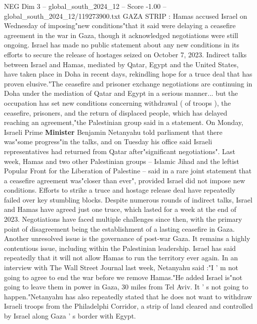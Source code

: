 \begin{textsample}{NEG Dim 3 – global\_south\_2024\_12 – Score -1.00 – global\_south\_2024\_12/119273900.txt}  \label{ex:f3_neg_070}
GAZA STRIP : Hamas accused Israel on Wednesday of imposing"new conditions"that it said were delaying a ceasefire agreement in the war in Gaza, though it acknowledged negotiations were still ongoing.
Israel has made no public statement about any new conditions in its efforts to secure the release of hostages seized on October 7, 2023.
Indirect talks between Israel and Hamas, mediated by Qatar, Egypt and the United States, have taken place in Doha in recent days, rekindling hope for a truce deal that has proven elusive."The ceasefire and prisoner exchange negotiations are continuing in Doha under the mediation of Qatar and Egypt in a serious manner... but the occupation has set new conditions concerning withdrawal ( of troops ), the ceasefire, prisoners, and the return of displaced people, which has delayed reaching an agreement,"the Palestinian group said in a statement.
On Monday, Israeli Prime \textbf{Minister} Benjamin Netanyahu told parliament that there was"some progress"in the talks, and on Tuesday his office said Israeli representatives had returned from Qatar after"significant negotiations".
Last week, Hamas and two other Palestinian groups -- Islamic Jihad and the leftist Popular Front for the Liberation of Palestine -- said in a rare joint statement that a ceasefire agreement was"closer than ever", provided Israel did not impose new conditions.
Efforts to strike a truce and hostage release deal have repeatedly failed over key stumbling blocks.
Despite numerous rounds of indirect talks, Israel and Hamas have agreed just one truce, which lasted for a week at the end of 2023.
Negotiations have faced multiple challenges since then, with the primary point of disagreement being the establishment of a lasting ceasefire in Gaza.
Another unresolved issue is the governance of post-war Gaza.
It remains a highly contentious issue, including within the Palestinian leadership.
Israel has said repeatedly that it will not allow Hamas to run the territory ever again.
In an interview with The Wall Street Journal last week, Netanyahu said :"I ' m not going to agree to end the war before we remove Hamas."He added Israel is"not going to leave them in power in Gaza, 30 miles from Tel Aviv.
It ' s not going to happen."Netanyahu has also repeatedly stated that he does not want to withdraw Israeli troops from the Philadelphi Corridor, a strip of land cleared and controlled by Israel along Gaza ' s border with Egypt.

\end{textsample}
